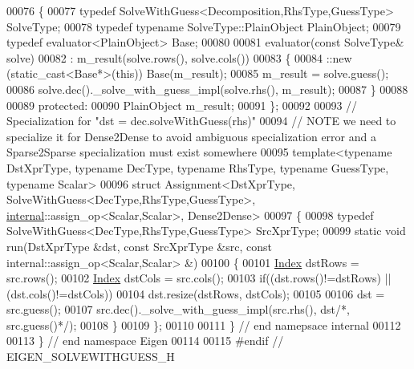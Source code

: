 \begin{DoxyCode}
00076 \{
00077   \textcolor{keyword}{typedef} SolveWithGuess<Decomposition,RhsType,GuessType> SolveType;
00078   \textcolor{keyword}{typedef} \textcolor{keyword}{typename} SolveType::PlainObject PlainObject;
00079   \textcolor{keyword}{typedef} evaluator<PlainObject> Base;
00080 
00081   evaluator(\textcolor{keyword}{const} SolveType& solve)
00082     : m\_result(solve.rows(), solve.cols())
00083   \{
00084     ::new (static\_cast<Base*>(\textcolor{keyword}{this})) Base(m\_result);
00085     m\_result = solve.guess();
00086     solve.dec().\_solve\_with\_guess\_impl(solve.rhs(), m\_result);
00087   \}
00088   
00089 protected:  
00090   PlainObject m\_result;
00091 \};
00092 
00093 \textcolor{comment}{// Specialization for "dst = dec.solveWithGuess(rhs)"}
00094 \textcolor{comment}{// NOTE we need to specialize it for Dense2Dense to avoid ambiguous specialization error and a
       Sparse2Sparse specialization must exist somewhere}
00095 template<typename DstXprType, typename DecType, typename RhsType, typename GuessType, typename Scalar>
00096 struct Assignment<DstXprType, SolveWithGuess<DecType,RhsType,GuessType>, 
      \hyperlink{namespaceinternal}{internal}::assign\_op<Scalar,Scalar>, Dense2Dense>
00097 \{
00098   \textcolor{keyword}{typedef} SolveWithGuess<DecType,RhsType,GuessType> SrcXprType;
00099   \textcolor{keyword}{static} \textcolor{keywordtype}{void} run(DstXprType &dst, \textcolor{keyword}{const} SrcXprType &src, \textcolor{keyword}{const} internal::assign\_op<Scalar,Scalar> &)
00100   \{
00101     \hyperlink{namespace_eigen_a62e77e0933482dafde8fe197d9a2cfde}{Index} dstRows = src.rows();
00102     \hyperlink{namespace_eigen_a62e77e0933482dafde8fe197d9a2cfde}{Index} dstCols = src.cols();
00103     \textcolor{keywordflow}{if}((dst.rows()!=dstRows) || (dst.cols()!=dstCols))
00104       dst.resize(dstRows, dstCols);
00105 
00106     dst = src.guess();
00107     src.dec().\_solve\_with\_guess\_impl(src.rhs(), dst\textcolor{comment}{/*, src.guess()*/});
00108   \}
00109 \};
00110 
00111 \} \textcolor{comment}{// end namepsace internal}
00112 
00113 \} \textcolor{comment}{// end namespace Eigen}
00114 
00115 \textcolor{preprocessor}{#endif // EIGEN\_SOLVEWITHGUESS\_H}
\end{DoxyCode}
